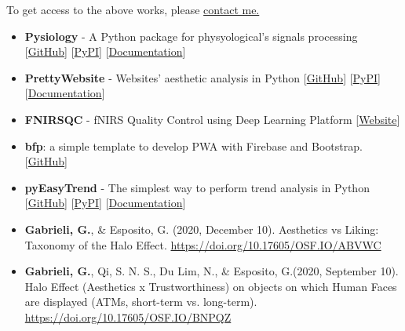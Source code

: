 \documentclass[10pt,a4paper]{altacv}
\begin{document}
\begin{fullwidth}
		To get access to the above works, please \href{mailto:gack94@gmail.com}{contact me.}
		
		\begin{itemize}
			\item \textbf{Pysiology} - A Python package for physyological's signals processing  [\href{https://github.com/Gabrock94/Pysiology}{GitHub}] [\href{https://pypi.org/project/pysiology/}{PyPI}] [\href{https://pysiology.rtfd.io}{Documentation}] 
			
			\item \textbf{PrettyWebsite} -  Websites' aesthetic analysis in Python  [\href{https://github.com/Gabrock94/PrettyWebsite}{GitHub}] [\href{https://pypi.org/project/prettywebsite/0.0.3/}{PyPI}] [\href{https://prettywebsite.readthedocs.io/en/latest/?badge=latest}{Documentation}] 
			
			\item \textbf{FNIRSQC} -  fNIRS Quality Control using Deep Learning Platform  [\href{https://socialaffectiveneuroscience.com/fnirsqc/}{Website}]
			
			\item \textbf{bfp}: a simple template to develop PWA with Firebase and Bootstrap.  [\href{https://github.com/Gabrock94/bfp}{GitHub}]
			
			\item \textbf{pyEasyTrend} - The simplest way to perform trend analysis in Python [\href{https://github.com/Gabrock94/pyEasyTrend}{GitHub}] [\href{https://pypi.org/project/pyEasyTrend/}{PyPI}] [\href{https://pyeasytrend.readthedocs.io}{Documentation}] 
		\end{itemize}
		
		
		\begin{itemize}
		    \item \textbf{Gabrieli, G.}, \& Esposito, G. (2020, December 10). Aesthetics vs Liking: Taxonomy of the Halo Effect. \href{https://doi.org/10.17605/OSF.IO/ABVWC}{https://doi.org/10.17605/OSF.IO/ABVWC}
            \item \textbf{Gabrieli, G.}, Qi, S. N. S., Du Lim, N., \& Esposito, G.(2020, September 10). Halo Effect (Aesthetics x Trustworthiness) on objects on which Human Faces are displayed  (ATMs, short-term vs. long-term). \href{https://doi.org/10.17605/OSF.IO/BNPQZ}{https://doi.org/10.17605/OSF.IO/BNPQZ}
            

\end{itemize}
\end{fullwidth}
\end{document}
